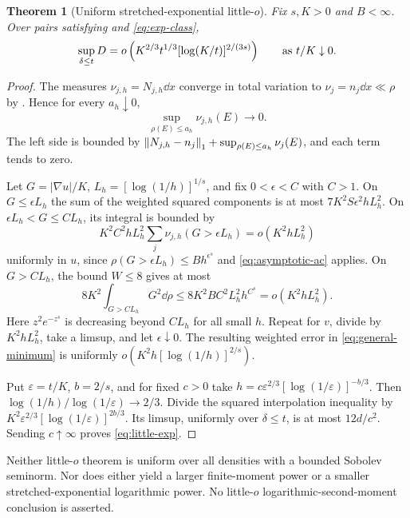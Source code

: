 \documentclass[11pt]{article}
\numberwithin{equation}{section}
\newtheorem{theorem}{Theorem}[section]
\theoremstyle{remark}\newtheorem{remark}[theorem]{Remark}
\begin{document}
\begin{theorem}[Uniform stretched-exponential little-$o$]\label{thm:little-exp}
Fix $s,K>0$ and $B<\infty$. Over pairs satisfying  and \eqref{eq:exp-class},
\begin{equation}\label{eq:little-exp}
 \sup_{\delta\le t}D
 =o\left(K^{2/3}t^{1/3}[\log(K/t)]^{2/(3s)}\right)
 \qquad\hbox{as }t/K\downarrow0.
\end{equation}
\end{theorem}
\begin{proof}
The measures $\nu_{j,h}=N_{j,h}\dd x$ converge in total variation to $\nu_j=n_j\dd x\ll\rho$ by . Hence for every $a_h\downarrow0$,
\begin{equation}\label{eq:asymptotic-ac}
 \sup_{\rho(E)\le a_h}\nu_{j,h}(E)\longrightarrow0.
\end{equation}
The left side is bounded by $\left\lVert N_{j,h}-n_j\right\rVert_1+\sup_{\rho(E)\le a_h}\nu_j(E)$, and each term tends to zero.

Let $G=|\nabla u|/K$, $L_h=[\log(1/h)]^{1/s}$, and fix $0<\epsilon<C$ with $C>1$. On $G\le\epsilon L_h$ the sum of the weighted squared components is at most
$7K^2S\epsilon^2hL_h^2$. On $\epsilon L_h<G\le CL_h$, its integral is bounded by
\[
 K^2C^2hL_h^2\sum_j\nu_{j,h}(G>\epsilon L_h)=o(K^2hL_h^2)
\]
uniformly in $u$, since $\rho(G>\epsilon L_h)\le Bh^{\epsilon^s}$ and \eqref{eq:asymptotic-ac} applies. On $G>CL_h$, the bound $W\le8$ gives at most
\[
 8K^2\int_{G>CL_h}G^2\dd\rho
 \le8K^2BC^2L_h^2h^{C^s}=o(K^2hL_h^2).
\]
Here $z^2e^{-z^s}$ is decreasing beyond $CL_h$ for all small $h$. Repeat for $v$, divide by $K^2hL_h^2$, take a limsup, and let $\epsilon\downarrow0$. The resulting weighted error in \eqref{eq:general-minimum} is uniformly
$o(K^2h[\log(1/h)]^{2/s})$.

Put $\varepsilon=t/K$, $b=2/s$, and for fixed $c>0$ take
$h=c\varepsilon^{2/3}[\log(1/\varepsilon)]^{-b/3}$.
Then $\log(1/h)/\log(1/\varepsilon)\to2/3$. Divide the squared interpolation inequality by
$K^2\varepsilon^{2/3}[\log(1/\varepsilon)]^{2b/3}$. Its limsup, uniformly over $\delta\le t$, is at most $12d/c^2$. Sending $c\uparrow\infty$ proves \eqref{eq:little-exp}.
\end{proof}

Neither little-$o$ theorem is uniform over all densities with a bounded Sobolev seminorm. Nor does either yield a larger finite-moment power or a smaller stretched-exponential logarithmic power. No little-$o$ logarithmic-second-moment conclusion is asserted.
\end{document}
